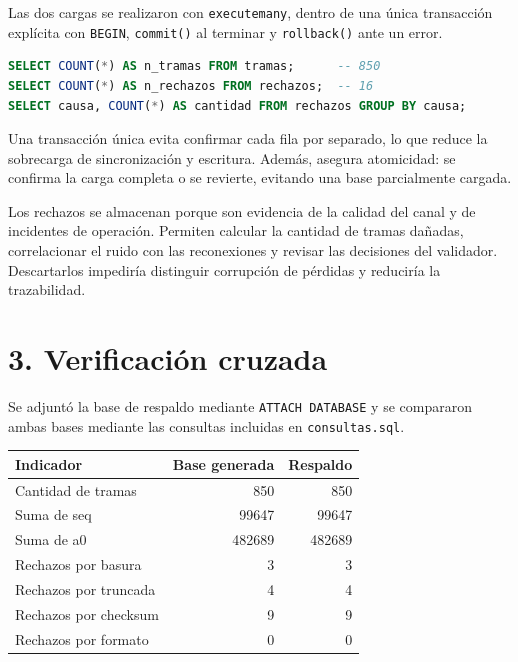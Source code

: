 \documentclass[
  11pt,
]{article}
\newcommand{\passthrough}[1]{#1}
\begin{document}
Las dos cargas se realizaron con \passthrough{\lstinline!executemany!},
dentro de una única transacción explícita con
\passthrough{\lstinline!BEGIN!}, \passthrough{\lstinline!commit()!} al
terminar y \passthrough{\lstinline!rollback()!} ante un error.

\begin{lstlisting}[language=SQL]
SELECT COUNT(*) AS n_tramas FROM tramas;      -- 850
SELECT COUNT(*) AS n_rechazos FROM rechazos;  -- 16
SELECT causa, COUNT(*) AS cantidad FROM rechazos GROUP BY causa;
\end{lstlisting}

Una transacción única evita confirmar cada fila por separado, lo que
reduce la sobrecarga de sincronización y escritura. Además, asegura
atomicidad: se confirma la carga completa o se revierte, evitando una
base parcialmente cargada.

Los rechazos se almacenan porque son evidencia de la calidad del canal y
de incidentes de operación. Permiten calcular la cantidad de tramas
dañadas, correlacionar el ruido con las reconexiones y revisar las
decisiones del validador. Descartarlos impediría distinguir corrupción
de pérdidas y reduciría la trazabilidad.

\hypertarget{verificaciuxf3n-cruzada}{%
\section{3. Verificación cruzada}\label{verificaciuxf3n-cruzada}}

Se adjuntó la base de respaldo mediante
\passthrough{\lstinline!ATTACH DATABASE!} y se compararon ambas bases
mediante las consultas incluidas en
\passthrough{\lstinline!consultas.sql!}.

\Needspace{4.5cm}
\begin{longtable}[]{@{}lrr@{}}
\toprule\noalign{}
Indicador & Base generada & Respaldo \\
\midrule\noalign{}
\endhead
\bottomrule\noalign{}
\endlastfoot
Cantidad de tramas & 850 & 850 \\
Suma de seq & 99647 & 99647 \\
Suma de a0 & 482689 & 482689 \\
Rechazos por basura & 3 & 3 \\
Rechazos por truncada & 4 & 4 \\
Rechazos por checksum & 9 & 9 \\
Rechazos por formato & 0 & 0 \\
\end{longtable}
\end{document}
